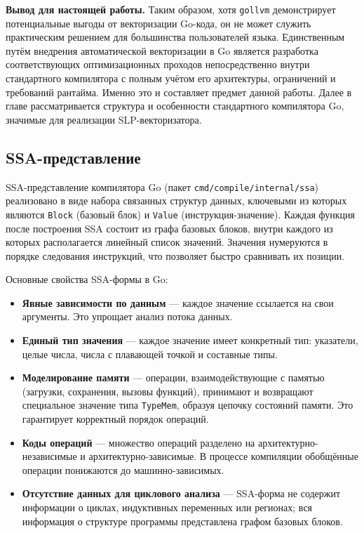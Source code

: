\textbf{Вывод для настоящей работы.} Таким образом, хотя \texttt{gollvm} демонстрирует потенциальные выгоды от векторизации Go-кода,
он не может служить практическим решением для большинства пользователей языка.
Единственным путём внедрения автоматической векторизации в Go является разработка соответствующих оптимизационных проходов
непосредственно внутри стандартного компилятора с полным учётом его архитектуры, ограничений и требований рантайма.
Именно это и составляет предмет данной работы. 
Далее в главе рассматривается структура и особенности стандартного компилятора Go, значимые для реализации SLP-векторизатора.

\subsection{SSA-представление}
\label{sec:go_ssa}

SSA-представление компилятора Go (пакет \texttt{cmd/compile/internal/ssa}) реализовано в виде набора связанных структур данных, ключевыми из которых являются \texttt{Block} (базовый блок) и \texttt{Value} (инструкция-значение). Каждая функция после построения SSA состоит из графа базовых блоков, внутри каждого из которых располагается линейный список значений. Значения нумеруются в порядке следования инструкций, что позволяет быстро сравнивать их позиции.

Основные свойства SSA-формы в Go:

\begin{itemize}
    \item \textbf{Явные зависимости по данным} --- каждое значение ссылается на свои аргументы. 
    Это упрощает анализ потока данных.
    \item \textbf{Единый тип значения} --- каждое значение имеет конкретный тип: указатели, целые числа, 
    числа с плавающей точкой и составные типы.
    \item \textbf{Моделирование памяти} --- операции, взаимодействующие с памятью (загрузки, сохранения, вызовы функций), 
    принимают и возвращают специальное значение типа \texttt{TypeMem}, 
    образуя цепочку состояний памяти. Это гарантирует корректный порядок операций.
    \item \textbf{Коды операций} --- множество операций разделено на архитектурно-независимые и архитектурно-зависимые. 
    В процессе компиляции обобщённые операции понижаются до машинно-зависимых.
    \item \textbf{Отсутствие данных для циклового анализа} --- SSA-форма не содержит информации о циклах, 
    индуктивных переменных или регионах; вся информация о структуре программы представлена графом базовых блоков.
\end{itemize}


